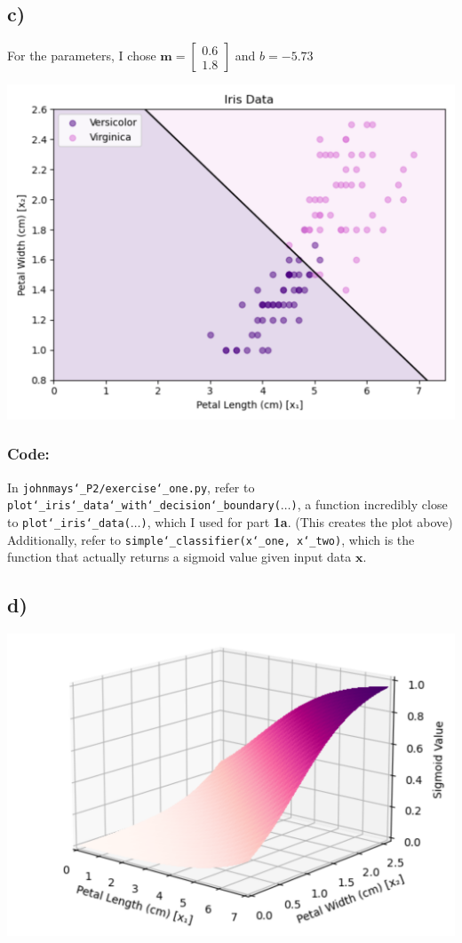\documentclass{article} %
\newcommand{\us}{\char`_}
\begin{document}
\subsection*{c)}
For the parameters, I chose $\mathbf{m}=\begin{bmatrix}0.6\\1.8\end{bmatrix}$ and $b=-5.73$
\begin{center}
    \includegraphics[scale=0.40]{1c_plot_colored.png}
\end{center}
\subsubsection*{Code:}
In \texttt{johnmays\us P2/exercise\us one.py}, refer to \texttt{plot\char`_iris\char`_data\char`_with\char`_decision\char`_boundary($\hdots$)}, a function incredibly close to \texttt{plot\char`_iris\char`_data($\hdots$)}, which I used for part \textbf{1a}.  (This creates the plot above)\\
Additionally, refer to \texttt{simple\char`_classifier(x\char`_one, x\char`_two)}, which is the function that actually returns a sigmoid value given input data $\mathbf{x}$.
\subsection*{d)}
\begin{center}
    \includegraphics[scale=0.5]{1d_plot.png}
\end{center}
\end{document}
